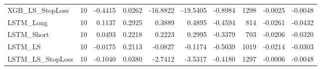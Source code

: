 \begin{tabular}{llrrrrrrrr}
\cline{1-10}
XGB\_LS\_StopLoss & 10 & -0.4415 & 0.0262 & -16.8822 & -19.5405 & -0.8984 & 1298 & -0.0025 & -0.0048 \\
\cline{1-10}
LSTM\_Long & 10 & 0.1137 & 0.2925 & 0.3889 & 0.4895 & -0.4594 & 814 & -0.0261 & -0.0432 \\
\cline{1-10}
LSTM\_Short & 10 & 0.0493 & 0.2218 & 0.2223 & 0.2995 & -0.3379 & 703 & -0.0206 & -0.0320 \\
\cline{1-10}
LSTM\_LS & 10 & -0.0175 & 0.2113 & -0.0827 & -0.1174 & -0.5039 & 1019 & -0.0214 & -0.0303 \\
\cline{1-10}
LSTM\_LS\_StopLoss & 10 & -0.1040 & 0.0380 & -2.7412 & -3.5317 & -0.4180 & 1297 & -0.0006 & -0.0048 \\
\cline{1-10}
\bottomrule
\end{tabular}
